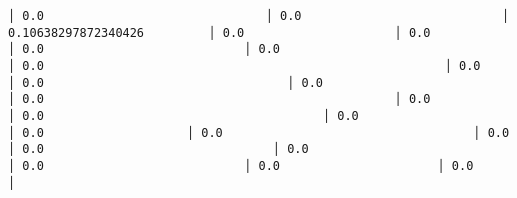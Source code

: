 \documentclass[11pt]{article}
\begin{document}
\begin{Verbatim}[commandchars=\\\{\}]
                         │ 0.0                               │ 0.0                            │ 0.10638297872340426         │ 0.0                     │ 0.0                      │ 0.0                            │ 0.0                                   │ 0.0                                                        │ 0.0                                       │ 0.0                                  │ 0.0                                │ 0.0                                                 │ 0.0                                       │ 0.0                                       │ 0.0                                │ 0.0                    │ 0.0                                   │ 0.0                                  │ 0.0                                │ 0.0                                    │ 0.0                            │ 0.0                      │ 0.0                         │

\end{Verbatim}
\end{document}
